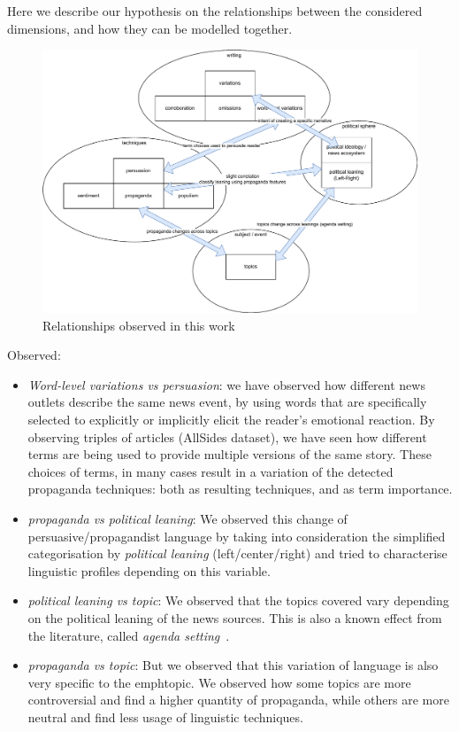 Here we describe our hypothesis on the relationships between the considered dimensions, and how they can be modelled together.

\begin{figure}[!htbp]
    \centering
    \includegraphics[width=\linewidth]{relationships.pdf}
    \caption{Relationships observed in this work}
    \label{fig:relationships}
\end{figure}

Observed:

\begin{itemize}
    \item \emph{Word-level variations vs persuasion}: we have observed how different news outlets describe the same news event, by using words that are specifically selected to explicitly or implicitly elicit the reader’s emotional reaction. By observing triples of articles (AllSides dataset), we have seen how different terms are being used to provide multiple versions of the same story. These choices of terms, in many cases result in a variation of the detected propaganda techniques: both as resulting techniques, and as term importance.

    \item \emph{propaganda vs political leaning}: We observed this change of persuasive/propagandist language by taking into consideration the simplified categorisation by \emph{political leaning} (left/center/right) and tried to characterise linguistic profiles depending on this variable.

    \item \emph{political leaning vs topic}: We observed that the topics covered vary depending on the political leaning of the news sources. This is also a known effect from the literature, called \emph{agenda setting}~\citep{mccombs1972agenda}.

    \item \emph{propaganda vs topic}: But we observed that this variation of language is also very specific to the emph{topic}. We observed how some topics are more controversial and find a higher quantity of propaganda, while others are more neutral and find less usage of linguistic techniques.
\end{itemize}

